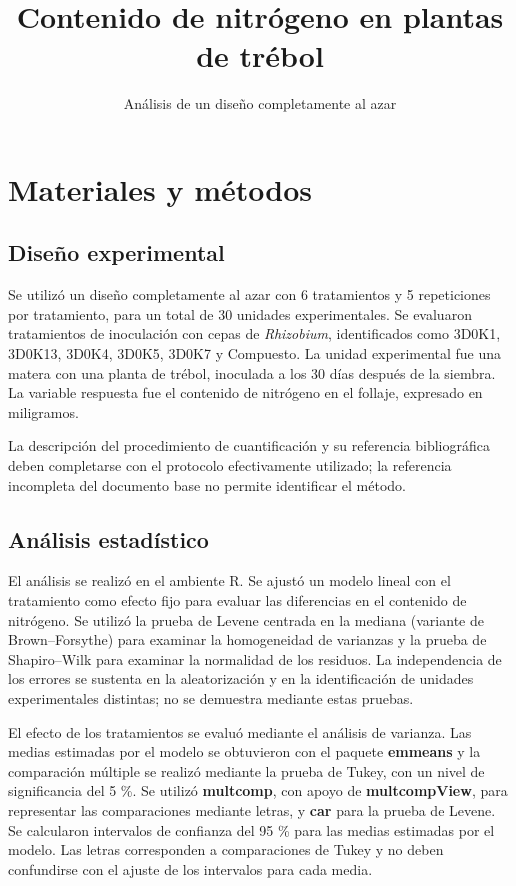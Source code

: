\documentclass[
  spanish,
  letterpaper,
  DIV=11,
  numbers=noendperiod]{scrartcl}
\title{Contenido de nitrógeno en plantas de trébol}
\subtitle{Análisis de un diseño completamente al azar}
\author{}
\date{}
\begin{document}
\maketitle


\section{Materiales y métodos}\label{materiales-y-muxe9todos}

\subsection{Diseño experimental}\label{diseuxf1o-experimental}

Se utilizó un diseño completamente al azar con 6 tratamientos y 5
repeticiones por tratamiento, para un total de 30 unidades
experimentales. Se evaluaron tratamientos de inoculación con cepas de
\emph{Rhizobium}, identificados como 3D0K1, 3D0K13, 3D0K4, 3D0K5, 3D0K7
y Compuesto. La unidad experimental fue una matera con una planta de
trébol, inoculada a los 30 días después de la siembra. La variable
respuesta fue el contenido de nitrógeno en el follaje, expresado en
miligramos.

La descripción del procedimiento de cuantificación y su referencia
bibliográfica deben completarse con el protocolo efectivamente
utilizado; la referencia incompleta del documento base no permite
identificar el método.

\subsection{Análisis estadístico}\label{anuxe1lisis-estaduxedstico}

El análisis se realizó en el ambiente R. Se ajustó un modelo lineal con
el tratamiento como efecto fijo para evaluar las diferencias en el
contenido de nitrógeno. Se utilizó la prueba de Levene centrada en la
mediana (variante de Brown--Forsythe) para examinar la homogeneidad de
varianzas y la prueba de Shapiro--Wilk para examinar la normalidad de
los residuos. La independencia de los errores se sustenta en la
aleatorización y en la identificación de unidades experimentales
distintas; no se demuestra mediante estas pruebas.

El efecto de los tratamientos se evaluó mediante el análisis de
varianza. Las medias estimadas por el modelo se obtuvieron con el
paquete \textbf{emmeans} y la comparación múltiple se realizó mediante
la prueba de Tukey, con un nivel de significancia del 5 \%. Se utilizó
\textbf{multcomp}, con apoyo de \textbf{multcompView}, para representar
las comparaciones mediante letras, y \textbf{car} para la prueba de
Levene. Se calcularon intervalos de confianza del 95 \% para las medias
estimadas por el modelo. Las letras corresponden a comparaciones de
Tukey y no deben confundirse con el ajuste de los intervalos para cada
media.
\end{document}
